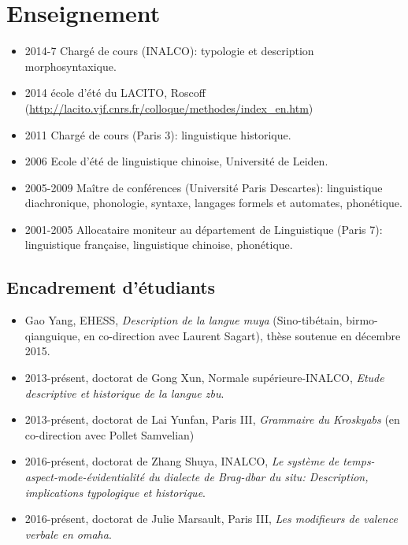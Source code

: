 \documentclass[oldfontcommands,oneside,a4paper,11pt]{article}
\begin{document}
\section*{Enseignement}
\begin{itemize}
\item 2014-7 Chargé de cours (INALCO): typologie et description morphosyntaxique.
\item 2014 école d'été du LACITO, Roscoff (\url{http://lacito.vjf.cnrs.fr/colloque/methodes/index\_en.htm})
\item 2011 Chargé de cours (Paris 3): linguistique historique.
\item  2006 Ecole d'été de linguistique chinoise, Université de Leiden.
\item 2005-2009 Maître de conférences (Université Paris Descartes): linguistique diachronique, phonologie, syntaxe, langages formels et automates, phonétique.
\item 2001-2005 Allocataire moniteur au département de Linguistique (Paris 7): linguistique française, linguistique chinoise, phonétique.
\end{itemize}


\subsection*{Encadrement d'étudiants}
\begin{itemize}
\item Gao Yang, EHESS, \textit{Description de la langue muya} (Sino-tibétain, birmo-qianguique, en co-direction avec Laurent Sagart), thèse soutenue en décembre 2015.
\item 2013-présent, doctorat de Gong Xun, Normale supérieure-INALCO, \textit{Etude descriptive et historique de la langue zbu}.
\item 2013-présent, doctorat de Lai Yunfan, Paris III, \textit{Grammaire du Kroskyabs} (en co-direction avec Pollet Samvelian)
\item 2016-présent,  doctorat de Zhang Shuya, INALCO,  \textit{Le système de temps-aspect-mode-évidentialité du dialecte de Brag-dbar du situ: Description, implications typologique et historique}.
\item 2016-présent,  doctorat de Julie Marsault, Paris III, \textit{Les modifieurs de valence verbale en omaha}.
\end{itemize}
\end{document}
